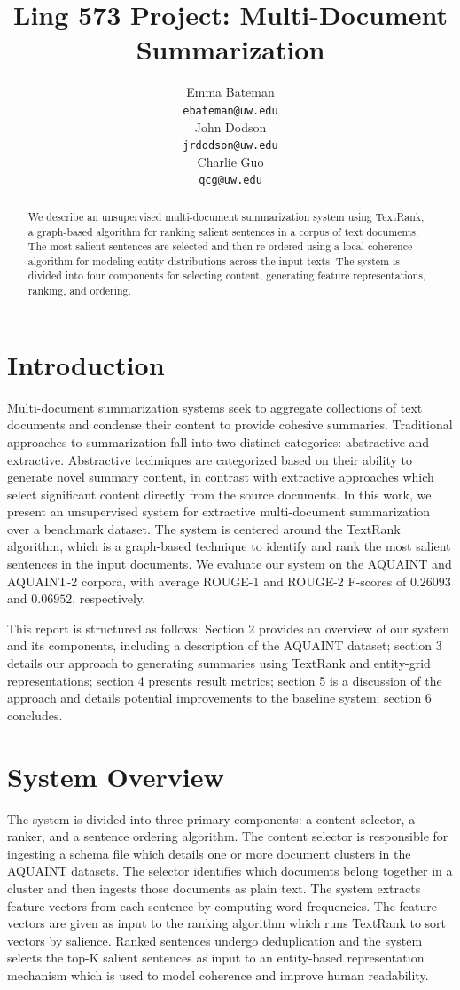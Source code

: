 \documentclass[11pt]{article}
\title{Ling 573 Project: Multi-Document Summarization}
\author{Emma Bateman \\
  {\tt ebateman@uw.edu} \\\And
  John Dodson \\
  {\tt jrdodson@uw.edu} \\\And
  Charlie Guo \\
  {\tt qcg@uw.edu}
  }
\date{}
\begin{document}
\maketitle
\begin{abstract}
We describe an unsupervised multi-document summarization system using TextRank, a graph-based algorithm for ranking salient sentences in a corpus of text documents. The most salient sentences are selected and then re-ordered using a local coherence algorithm for modeling entity distributions across the input texts. The system is divided into four components for selecting content, generating feature representations, ranking, and ordering.
\end{abstract}

\section{Introduction}

Multi-document summarization systems seek to aggregate collections of text documents and condense their content to provide cohesive summaries. Traditional approaches to summarization fall into two distinct categories: abstractive and extractive. Abstractive techniques are categorized based on their ability to generate novel summary content, in contrast with extractive approaches which select significant content directly from the source documents. In this work, we present an unsupervised system for extractive multi-document summarization over a benchmark dataset. The system is centered around the TextRank algorithm, which is a graph-based technique to identify and rank the most salient sentences in the input documents. We evaluate our system on the AQUAINT and AQUAINT-2 corpora, with average ROUGE-1 and ROUGE-2 F-scores of $0.26093$ and $0.06952$, respectively. 

This report is structured as follows: Section 2 provides an overview of our system and its components, including a description of the AQUAINT dataset; section 3 details our approach to generating summaries using TextRank and entity-grid representations; section 4 presents result metrics; section 5 is a discussion of the approach and details potential improvements to the baseline system; section 6 concludes.

\section{System Overview}
The system is divided into three primary components: a content selector, a ranker, and a sentence ordering algorithm. The content selector is responsible for ingesting a schema file which details one or more document clusters in the AQUAINT datasets. The selector identifies which documents belong together in a cluster and then ingests those documents as plain text. The system extracts feature vectors from each sentence by computing word frequencies. The feature vectors are given as input to the ranking algorithm which runs TextRank to sort vectors by salience. Ranked sentences undergo deduplication and the system selects the top-K salient sentences as input to an entity-based representation mechanism which is used to model coherence and improve human readability.
\end{document}
